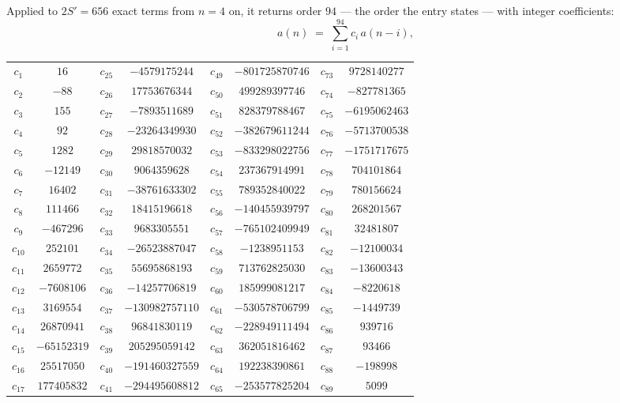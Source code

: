 \documentclass[11pt,a4paper]{article}
\theoremstyle{plain}
\theoremstyle{definition}
\begin{document}
Applied to $2S'=656$ exact terms from $n=4$ on, it returns order $94$ --- the
order the entry states --- with integer coefficients:
\[
a(n)\;=\;\sum_{i=1}^{94}c_i\,a(n-i),
\]
\begin{center}\small
\begin{tabular}{cccccccc}
$c_{1}$ & $16$ & $c_{25}$ & $-4579175244$ & $c_{49}$ & $-801725870746$ & $c_{73}$ & $9728140277$ \\
$c_{2}$ & $-88$ & $c_{26}$ & $17753676344$ & $c_{50}$ & $499289397746$ & $c_{74}$ & $-827781365$ \\
$c_{3}$ & $155$ & $c_{27}$ & $-7893511689$ & $c_{51}$ & $828379788467$ & $c_{75}$ & $-6195062463$ \\
$c_{4}$ & $92$ & $c_{28}$ & $-23264349930$ & $c_{52}$ & $-382679611244$ & $c_{76}$ & $-5713700538$ \\
$c_{5}$ & $1282$ & $c_{29}$ & $29818570032$ & $c_{53}$ & $-833298022756$ & $c_{77}$ & $-1751717675$ \\
$c_{6}$ & $-12149$ & $c_{30}$ & $9064359628$ & $c_{54}$ & $237367914991$ & $c_{78}$ & $704101864$ \\
$c_{7}$ & $16402$ & $c_{31}$ & $-38761633302$ & $c_{55}$ & $789352840022$ & $c_{79}$ & $780156624$ \\
$c_{8}$ & $111466$ & $c_{32}$ & $18415196618$ & $c_{56}$ & $-140455939797$ & $c_{80}$ & $268201567$ \\
$c_{9}$ & $-467296$ & $c_{33}$ & $9683305551$ & $c_{57}$ & $-765102409949$ & $c_{81}$ & $32481807$ \\
$c_{10}$ & $252101$ & $c_{34}$ & $-26523887047$ & $c_{58}$ & $-1238951153$ & $c_{82}$ & $-12100034$ \\
$c_{11}$ & $2659772$ & $c_{35}$ & $55695868193$ & $c_{59}$ & $713762825030$ & $c_{83}$ & $-13600343$ \\
$c_{12}$ & $-7608106$ & $c_{36}$ & $-14257706819$ & $c_{60}$ & $185999081217$ & $c_{84}$ & $-8220618$ \\
$c_{13}$ & $3169554$ & $c_{37}$ & $-130982757110$ & $c_{61}$ & $-530578706799$ & $c_{85}$ & $-1449739$ \\
$c_{14}$ & $26870941$ & $c_{38}$ & $96841830119$ & $c_{62}$ & $-228949111494$ & $c_{86}$ & $939716$ \\
$c_{15}$ & $-65152319$ & $c_{39}$ & $205295059142$ & $c_{63}$ & $362051816462$ & $c_{87}$ & $93466$ \\
$c_{16}$ & $25517050$ & $c_{40}$ & $-191460327559$ & $c_{64}$ & $192238390861$ & $c_{88}$ & $-198998$ \\
$c_{17}$ & $177405832$ & $c_{41}$ & $-294495608812$ & $c_{65}$ & $-253577825204$ & $c_{89}$ & $5099$ \\

\end{tabular}
\end{center}
\end{document}
